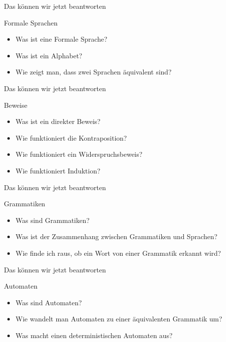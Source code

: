 \begin{frame}[fragile]{Das können wir jetzt beantworten}
    \begin{alertblock}{Formale Sprachen}
    \begin{itemize}
        \item Was ist eine Formale Sprache?
        \item Was ist ein Alphabet?
        \item Wie zeigt man, dass zwei Sprachen äquivalent sind?
    \end{itemize}
    \end{alertblock}
\end{frame}

\begin{frame}[fragile]{Das können wir jetzt beantworten}
    \begin{alertblock}{Beweise}
    \begin{itemize}
        \item Was ist ein direkter Beweis?
        \item Wie funktioniert die Kontraposition?
        \item Wie funktioniert ein Widerspruchsbeweis?
        \item Wie funktioniert Induktion?
    \end{itemize}
    \end{alertblock}
\end{frame}

\begin{frame}[fragile]{Das können wir jetzt beantworten}
    \begin{alertblock}{Grammatiken}
    \begin{itemize}
        \item Was sind Grammatiken?
        \item Was ist der Zusammenhang zwischen Grammatiken und Sprachen?
        \item Wie finde ich raus, ob ein Wort von einer Grammatik erkannt wird?
    \end{itemize}
    \end{alertblock}
\end{frame}

\begin{frame}[fragile]{Das können wir jetzt beantworten}
    \begin{alertblock}{Automaten}
    \begin{itemize}
        \item Was sind Automaten?
        \item Wie wandelt man Automaten zu einer äquivalenten Grammatik um?
        \item Was macht einen deterministischen Automaten aus?
    \end{itemize}
    \end{alertblock}
\end{frame}

